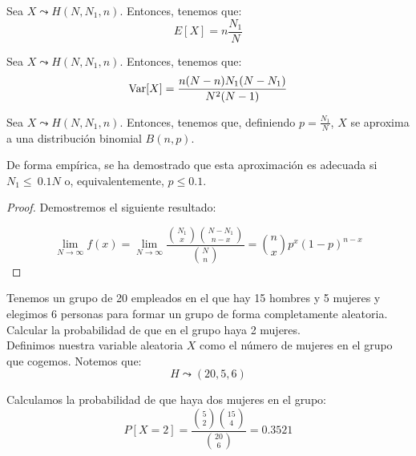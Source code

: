 \begin{prop}
    Sea $X\leadsto H(N,N_1,n)$. Entonces, tenemos que:
    \begin{equation*}
        E[X]= n\frac{N_1}{N}
    \end{equation*}
\end{prop}
\begin{prop}
    Sea $X\leadsto H(N,N_1,n)$. Entonces, tenemos que:
    \begin{equation*}
        \operatorname{Var}[X]=\frac{n(N-n)N_1(N-N_1)}{N^2(N-1)}
    \end{equation*}
\end{prop}

\begin{prop}
    Sea $X\leadsto H(N,N_1,n)$. Entonces, tenemos que, definiendo $p=\frac{N_1}{N}$, $X$ se aproxima a una distribución binomial $B(n,p)$.

    De forma empírica, se ha demostrado que esta aproximación es adecuada si $N_1\leq~0.1N$ o, equivalentemente, $p\leq 0.1$.
    
\end{prop}
\begin{proof}

    Demostremos el siguiente resultado:
    
    \begin{equation*}
        \lim_{N\to \infty}f(x) = \lim_{N\to \infty}\frac{\binom{N_1}{x}\binom{N-N_1}{n-x}}{\binom{N}{n}} = \binom{n}{x}p^x(1-p)^{n-x}
    \end{equation*}
\end{proof}

\begin{ejemplo}
    Tenemos un grupo de 20 empleados en el que hay 15 hombres y 5 mujeres y elegimos 6 personas para formar un grupo de forma completamente aleatoria.
    Calcular la probabilidad de que en el grupo haya 2 mujeres.\\
    
    Definimos nuestra variable aleatoria $X$ como el número de mujeres en el grupo que cogemos. Notemos que:
    \begin{equation*}
        H\leadsto (20, 5, 6)
    \end{equation*}
    
    Calculamos la probabilidad de que haya dos mujeres en el grupo:
    \begin{equation*}
        P[X=2]=\frac{\binom{5}{2}\binom{15}{4}}{\binom{20}{6}} = 0.3521
    \end{equation*}
\end{ejemplo}


